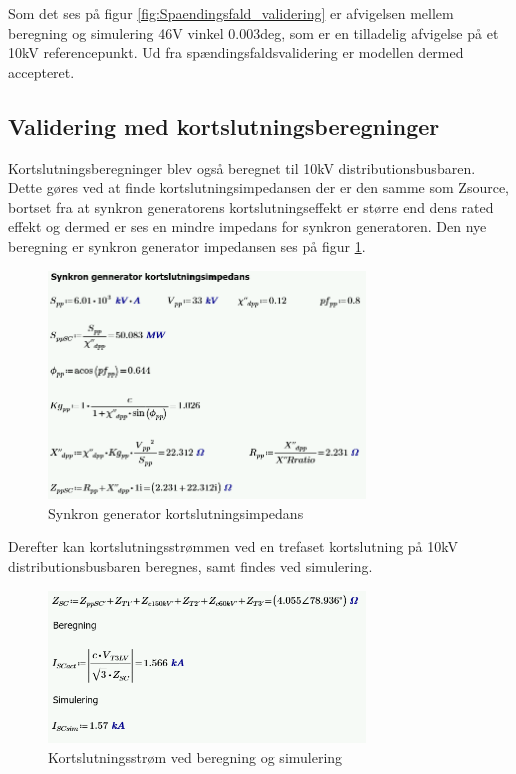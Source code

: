  Som det ses på figur \ref{fig:Spaendingsfald_validering} er afvigelsen mellem beregning og simulering 46V vinkel 0.003deg, som er en tilladelig afvigelse på et 10kV referencepunkt. Ud fra spændingsfaldsvalidering er modellen dermed accepteret.
 
\subsection{Validering med kortslutningsberegninger}
Kortslutningsberegninger blev også beregnet til 10kV distributionsbusbaren. Dette gøres ved at finde kortslutningsimpedansen der er den samme som Zsource, bortset fra at synkron generatorens kortslutningseffekt er større end dens rated effekt og dermed er ses en mindre impedans for synkron generatoren. Den nye beregning er synkron generator impedansen ses på figur \ref{fig:SGimpedansSC}.

\begin{figure}[H] %
	\centering
	\includegraphics[width=0.75\textwidth]{figurer/Synkron_generator_valideringSC}
	\caption{Synkron generator kortslutningsimpedans}
	\label{fig:SGimpedansSC}
\end{figure}

Derefter kan kortslutningsstrømmen ved en trefaset kortslutning på 10kV distributionsbusbaren beregnes, samt findes ved simulering.

\begin{figure}[H] %
	\centering
	\includegraphics[width=0.75\textwidth]{figurer/Kortslutningsstroem_validering}
	\caption{Kortslutningsstrøm ved beregning og simulering}
	\label{fig:SCvalidering}
\end{figure}

